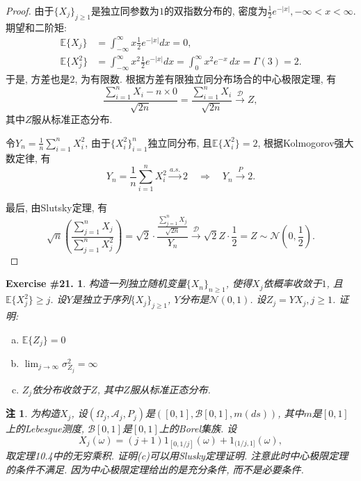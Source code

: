 \documentclass[UTF8, a4paper]{article}
\newtheorem{exercise}{Exercise \#21.}
\newtheorem*{remark}{注}
\begin{document}
\begin{proof}
由于\(\{X_j\}_{j\geq 1}\)是独立同参数为\(1\)的双指数分布的, 密度为\(\frac{1}{2}e^{-|x|}, -\infty < x < \infty\).
期望和二阶矩:
\begin{align*}
    \mathbb{E}\{X_j\} &= \int_{-\infty}^{\infty} x \frac{1}{2}e^{-|x|}dx  = 0,\\
    \mathbb{E}\{X_j^2\} &= \int_{-\infty}^{\infty} x^2 \frac{1}{2}e^{-|x|}dx = \int_{0}^{\infty} x^2 e^{-x} \,dx = \Gamma(3) = 2.
\end{align*}
于是, 方差也是\(2\), 为有限数.
根据方差有限独立同分布场合的中心极限定理, 有
$$
\frac{\sum_{i = 1}^{n}X_i - n \times 0}{\sqrt{2n}} = \frac{\sum_{i = 1}^{n}X_i}{\sqrt{2n}} \xrightarrow{\mathcal{D}} Z,
$$
其中\(Z\)服从标准正态分布.

令\(Y_n = \frac{1}{n}\sum_{i = 1}^{n}X_i^2\), 
由于\(\{X_i^2\}_{i = 1}^n\)独立同分布, 且\(\mathbb{E}\{X_i^2\} = 2\), 根据Kolmogorov强大数定律, 有
$$
Y_n = \frac{1}{n}\sum_{i = 1}^{n}X_i^2 \xrightarrow{a.s.} 2 \quad \Rightarrow \quad Y_n \xrightarrow{P} 2.
$$

最后, 由Slutsky定理, 有
$$
\sqrt{n}\left(\frac{\sum_{j=1}^n X_j}{\sum_{j=1}^n X_j^2}\right) = \sqrt{2}\cdot \frac{\frac{\sum_{j=1}^{n}X_j}{\sqrt{2n}}}{Y_n} \xrightarrow{\mathcal{D}} \sqrt{2}Z \cdot \frac{1}{2} = Z \sim \mathcal{N}\left(0, \frac{1}{2}\right).
$$
\end{proof}





\begin{framed}
\begin{exercise}
构造一列独立随机变量\(\{X_n\}_{n\geq 1}\), 使得\(X_j\)依概率收敛于\(1\), 且\(\mathbb{E}\{X_j^2\} \geq j\).
设\(Y\)是独立于序列\(\{X_j\}_{j\geq 1}\), \(Y\)分布是\(\mathcal{N}(0,1)\).
设\(Z_j = YX_j, j\geq 1\). 证明: 
\begin{enumerate}[a)]
    \item \(\mathbb{E}\{Z_j\} = 0\)
    \item \(\lim_{j\to \infty} \sigma_{Z_j}^2 = \infty\)
    \item \( Z_j \)依分布收敛于\(Z\), 其中\(Z\)服从标准正态分布.
\end{enumerate}
\end{exercise}
\end{framed}

\begin{remark}
为构造\(X_j\), 设\((\Omega_j, \mathcal{A}_j, P_j)\)是\(([0,1], \mathcal{B}[0,1], m(ds))\), 其中\(m\)是\([0,1]\)上的Lebesgue测度, \(\mathcal{B}[0,1]\)是\([0,1]\)上的Borel集族.
设 
$$
X_j(\omega)=(j+1) 1_{[0,1 / j]}(\omega)+1_{(1 / j, 1]}(\omega),
$$
取定理10.4中的无穷乘积. 证明(c)可以用Slusky定理证明. 注意此时中心极限定理的条件不满足. 因为中心极限定理给出的是充分条件, 而不是必要条件.
\end{remark}
\end{document}

